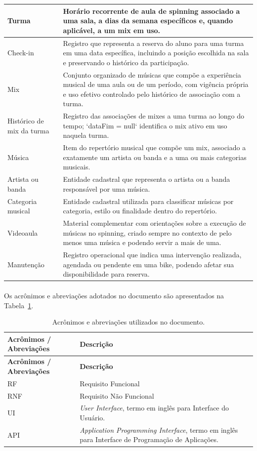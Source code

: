 \begin{longtable}{|p{4cm}|p{11cm}|}
    Turma & Horário recorrente de aula de spinning associado a uma sala, a dias da semana específicos e, quando aplicável, a um mix em uso. \\ \hline
    Check-in & Registro que representa a reserva do aluno para uma turma em uma data específica, incluindo a posição escolhida na sala e preservando o histórico da participação. \\ \hline
    Mix & Conjunto organizado de músicas que compõe a experiência musical de uma aula ou de um período, com vigência própria e uso efetivo controlado pelo histórico de associação com a turma. \\ \hline
    Histórico de mix da turma & Registro das associações de mixes a uma turma ao longo do tempo; `dataFim = null` identifica o mix ativo em uso naquela turma. \\ \hline
    Música & Item do repertório musical que compõe um mix, associado a exatamente um artista ou banda e a uma ou mais categorias musicais. \\ \hline
    Artista ou banda & Entidade cadastral que representa o artista ou a banda responsável por uma música. \\ \hline
    Categoria musical & Entidade cadastral utilizada para classificar músicas por categoria, estilo ou finalidade dentro do repertório. \\ \hline
    Videoaula & Material complementar com orientações sobre a execução de músicas no spinning, criado sempre no contexto de pelo menos uma música e podendo servir a mais de uma. \\ \hline
    Manutenção & Registro operacional que indica uma intervenção realizada, agendada ou pendente em uma bike, podendo afetar sua disponibilidade para reserva. \\ \hline
\end{longtable}

\paragraph{}Os acrônimos e abreviações adotados no documento são apresentados na Tabela~\ref{tab:acronyms}.

\begin{longtable}{|p{4cm}|p{11cm}|}
    \caption{Acrônimos e abreviações utilizados no documento.}\label{tab:acronyms} \\ \hline
    \textbf{Acrônimos / Abreviações} & \textbf{Descrição} \\ \hline
    \endfirsthead
    \hline
    \textbf{Acrônimos / Abreviações} & \textbf{Descrição} \\ \hline
    \endhead
    RF & Requisito Funcional \\ \hline
    RNF & Requisito Não Funcional \\ \hline
    UI & \textit{User Interface}, termo em inglês para Interface do Usuário. \\ \hline
    API & \textit{Application Programming Interface}, termo em inglês para Interface de Programação de Aplicações. \\ \hline
\end{longtable}
